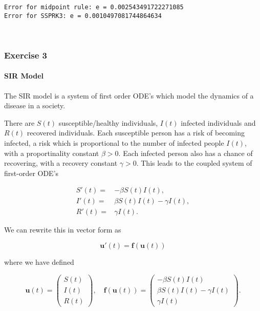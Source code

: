 \documentclass[11pt]{article}
\begin{document}
    \begin{Verbatim}[commandchars=\\\{\}]
Error for midpoint rule: e = 0.002543491722271085
Error for SSPRK3: e = 0.0010497081744864634
    \end{Verbatim}

    \begin{center}
    \end{center}
    { \hspace*{\fill} \\}
    
    \hypertarget{exercise-3}{%
\subsubsection{\texorpdfstring{\textbf{Exercise
3}}{Exercise 3}}\label{exercise-3}}

\hypertarget{sir-model}{%
\paragraph{SIR Model}\label{sir-model}}

The SIR model is a system of first order ODE's which model the dynamics
of a disease in a society.

There are \(S(t)\) susceptible/healthy individuals, \(I(t)\) infected
individuals and \(R(t)\) recovered individuals. Each susceptible person
has a risk of becoming infected, a risk which is proportional to the
number of infected people \(I(t)\), with a proportinality constant
\(\beta>0.\) Each infected person also has a chance of recovering, with
a recovery constant \(\gamma>0\). This leads to the coupled system of
first-order ODE's

\[
\begin{align*}
S'(t) = &  -\beta S(t) I(t),\\
I'(t) = &  \beta S(t) I(t) - \gamma I(t),\\
R'(t) = &  \gamma I(t).
\end{align*}
\]

We can rewrite this in vector form as

\[
\mathbf{u}'(t) = \mathbf{f}(\mathbf{u}(t))
\]

where we have defined

\[
\mathbf{u}(t) = 
\begin{pmatrix}
S(t)\\
I(t)\\
R(t)
\end{pmatrix}, \quad 
\mathbf{f}(\mathbf{u}(t)) = 
\begin{pmatrix}
-\beta S(t) I(t)\\
\beta S(t) I(t) - \gamma I(t)\\
\gamma I(t)
\end{pmatrix}.
\]
\end{document}
